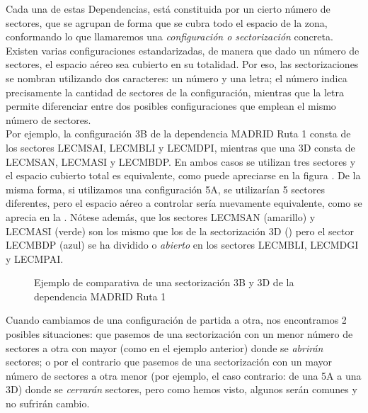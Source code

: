 Cada una de estas Dependencias, está constituida por un cierto número de sectores, que se agrupan de forma que se cubra todo el espacio de la zona, conformando lo que llamaremos una \textit{configuración o sectorización} concreta. Existen varias configuraciones estandarizadas, de manera que dado un número de sectores, el espacio aéreo sea cubierto en su totalidad. Por eso, las sectorizaciones se nombran utilizando dos caracteres: un número y una letra; el número indica precisamente la cantidad de sectores de la configuración, mientras que la letra permite diferenciar entre dos posibles configuraciones que emplean el mismo número de sectores.
\\

Por ejemplo, la configuración 3B de la dependencia MADRID Ruta 1 consta de los sectores LECMSAI, LECMBLI y LECMDPI, mientras que una 3D consta de LECMSAN, LECMASI y LECMBDP. En ambos casos se utilizan tres sectores y el espacio cubierto total es equivalente, como puede apreciarse en la figura .
De la misma forma, si utilizamos una configuración 5A, se utilizarían 5 sectores diferentes, pero el espacio aéreo a controlar sería nuevamente equivalente, como se aprecia en la . Nótese además, que los sectores LECMSAN (amarillo) y LECMASI (verde) son los mismo que los de la sectorización 3D () pero el sector LECMBDP (azul) se ha dividido o \textit{abierto} en los sectores LECMBLI, LECMDGI y LECMPAI.
\\

\begin{figure}[htbp]
    \centering


    \caption{Ejemplo de comparativa de una sectorización 3B y 3D de la dependencia MADRID Ruta 1}
    \label{fig:2:comparativa3B-3D}
\end{figure}


Cuando cambiamos de una configuración de partida a otra, nos encontramos 2 posibles situaciones: que pasemos de una sectorización con un menor número de sectores a otra con mayor (como en el ejemplo anterior) donde se \textit{abrirán} sectores; o por el contrario que pasemos de una sectorización con un mayor número de sectores a otra menor (por ejemplo, el caso contrario: de una 5A a una 3D) donde se \textit{cerrarán} sectores, pero como hemos visto, algunos serán comunes y no sufrirán cambio.
\\

